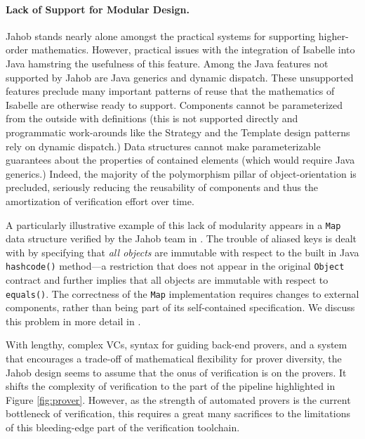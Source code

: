 \paragraph{Lack of Support for Modular Design.\label{sec:jahobNoModularity}}
Jahob stands nearly alone amongst the practical systems for supporting higher-order mathematics.  However, practical issues with the integration of Isabelle into Java hamstring the usefulness of this feature.  Among the Java features not supported by Jahob are Java generics and dynamic dispatch.  These unsupported features preclude many important patterns of reuse that the mathematics of Isabelle are otherwise ready to support.  Components cannot be parameterized from the outside with definitions (this is not supported directly and programmatic work-arounds like the Strategy and the Template design patterns rely on dynamic dispatch.)  Data structures cannot make parameterizable guarantees about the properties of contained elements (which would require Java generics.)  Indeed, the majority of the polymorphism pillar of object-orientation is precluded, seriously reducing the reusability of components and thus the amortization of verification effort over time.

A particularly illustrative example of this lack of modularity appears in a \texttt{Map} data structure verified by the Jahob team in \cite{zee:annotations}.  The trouble of aliased keys is dealt with by specifying that \emph{all objects} are immutable with respect to the built in Java \texttt{hashcode()} method---a restriction that does not appear in the original \texttt{Object} contract and further implies that all objects are immutable with respect to \texttt{equals()}.  The correctness of the \texttt{Map} implementation requires changes to external components, rather than being part of its self-contained specification.  We discuss this problem in more detail in \cite{bronishMap}.

\vspace{1.5em}With lengthy, complex VCs, syntax for guiding back-end provers, and a system that encourages a trade-off of mathematical flexibility for prover diversity, the Jahob design seems to assume that the onus of verification is on the provers.  It shifts the complexity of verification to the part of the pipeline highlighted in Figure \ref{fig:prover}.  However, as the strength of automated provers is the current bottleneck of verification, this requires a great many sacrifices to the limitations of this bleeding-edge part of the verification toolchain.

